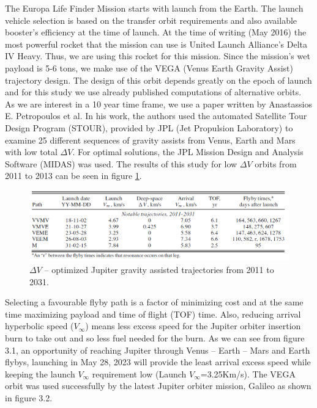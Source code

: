 The Europa Life Finder Mission starts with launch from the Earth. The launch vehicle selection is based on the transfer orbit requirements and also available booster’s efficiency at the time of launch. At the time of writing (May 2016) the most powerful rocket that the mission can use is United Launch Alliance’s Delta IV Heavy. Thus, we are using this rocket for this mission. Since the mission’s wet payload is 5-6 tons, we make use of the VEGA (Venus Earth Gravity Assist) trajectory design. The design of this orbit depends greatly on the epoch of launch and for this study we use already published computations of alternative orbits. As we are interest in a 10 year time frame, we use a paper written by Anastassios E. Petropoulos et al\cite{petropoulos2000a}. In his work, the authors used the automated Satellite Tour Design Program (STOUR), provided by JPL (Jet Propulsion Laboratory) to examine 25 different sequences of gravity assists from Venus, Earth and Mars with low total $\Delta V$. For optimal solutions, the JPL Mission Design and Analysis Software (MIDAS) was used. The results of this study for low $\Delta V$ orbits from 2011 to 2013 can be seen in figure \ref{fig:grav_ass_traj}.

\begin{figure}[htb!]
\centering
\includegraphics[width=1\textwidth]{figures/Orbiter/traj.png}
\caption{$\Delta V$ – optimized Jupiter gravity assisted trajectories from 2011 to 2031. \cite{petropoulos2000a}}\label{fig:grav_ass_traj}
\end{figure}

\noindent
Selecting a favourable flyby path is a factor of minimizing cost and at the same time maximizing payload and time of flight (TOF) time. Also, reducing arrival hyperbolic speed ($V_{\infty}$) means less excess speed for the Jupiter orbiter insertion burn to take out and so less fuel needed for the burn. As we can see from figure 3.1, an opportunity of reaching Jupiter through Venus – Earth – Mars and Earth flybys, launching in May 28, 2023 will provide the least arrival excess speed while keeping the launch $V_{\infty}$ requirement low (Launch $V_{\infty}$=3.25Km/s). The VEGA orbit was used successfully by the latest Jupiter orbiter mission, Galileo as shown in figure 3.2.

